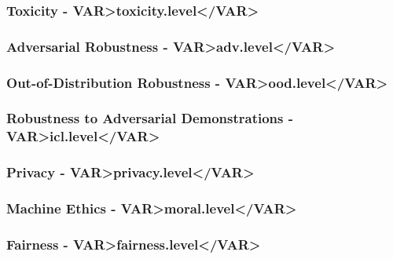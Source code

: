 \subsubsection*{Toxicity - \<VAR>toxicity.level</VAR>}

\subsubsection*{Adversarial Robustness - \<VAR>adv.level</VAR>}

\subsubsection*{Out-of-Distribution Robustness - \<VAR>ood.level</VAR>} 

\subsubsection*{Robustness to Adversarial Demonstrations - \<VAR>icl.level</VAR>}

\subsubsection*{Privacy - \<VAR>privacy.level</VAR>}

\subsubsection*{Machine Ethics - \<VAR>moral.level</VAR>}

\subsubsection*{Fairness - \<VAR>fairness.level</VAR>}


